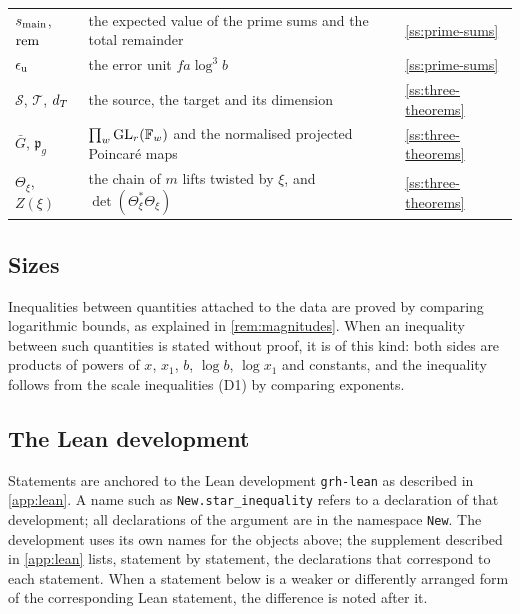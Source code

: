 \begin{longtable}{@{}>{\raggedright\arraybackslash}p{}>{\raggedright\arraybackslash}p{}>{\raggedright\arraybackslash}p{}@{}}
$s_{\mathrm{main}}$, $\mathrm{rem}$ & the expected value of the prime sums and the total remainder & \cref{ss:prime-sums}\\
$\epsilon_{\mathrm{u}}$ & the error unit $fa\log^3b$ & \cref{ss:prime-sums}\\
$\mathcal S$, $\mathcal T$, $d_T$ & the source, the target and its dimension & \cref{ss:three-theorems}\\
$\bar G$, $\mathfrak p_g$ & $\prod_w\operatorname{GL}_r(\mathbb{F}_w)$ and the normalised projected Poincar\'e maps & \cref{ss:three-theorems}\\
$\Theta_\xi$, $Z(\xi)$ & the chain of $m$ lifts twisted by $\xi$, and $\det(\Theta_\xi^*\Theta_\xi)$ & \cref{ss:three-theorems}\\
\bottomrule
\end{longtable}

\subsection{Sizes}\label{ss:notation-sizes}
Inequalities between quantities attached to the data are proved by comparing logarithmic bounds, as
explained in \cref{rem:magnitudes}. When an inequality between such quantities is stated without
proof, it is of this kind: both sides are products of powers of $x$, $x_1$, $b$, $\log b$, $\log x_1$
and constants, and the inequality follows from the scale inequalities (D1) by comparing exponents.

\subsection{The Lean development}\label{ss:notation-lean}
Statements are anchored to the Lean development \texttt{grh-lean} as described in \cref{app:lean}. A
name such as \texttt{New.star\_inequality} refers to a declaration of that development; all
declarations of the argument are in the namespace \texttt{New}. The development uses its own names for
the objects above; the supplement described in \cref{app:lean} lists, statement by statement, the
declarations that correspond to each statement. When a statement below is a weaker or
differently arranged form of the corresponding Lean statement, the difference is noted after it.
